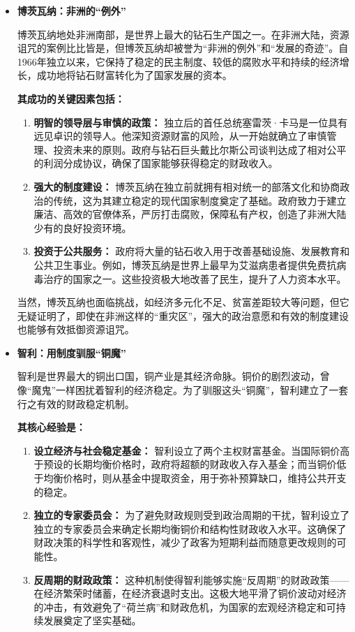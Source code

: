 \begin{itemize}
    \item \textbf{博茨瓦纳：非洲的“例外”}

    博茨瓦纳地处非洲南部，是世界上最大的钻石生产国之一。在非洲大陆，资源诅咒的案例比比皆是，但博茨瓦纳却被誉为“非洲的例外”和“发展的奇迹”。自1966年独立以来，它保持了稳定的民主制度、较低的腐败水平和持续的经济增长，成功地将钻石财富转化为了国家发展的资本。

    \textbf{其成功的关键因素包括：}
    \begin{enumerate}
        \item \textbf{明智的领导层与审慎的政策：} 独立后的首任总统塞雷茨·卡马是一位具有远见卓识的领导人。他深知资源财富的风险，从一开始就确立了审慎管理、投资未来的原则。政府与钻石巨头戴比尔斯公司谈判达成了相对公平的利润分成协议，确保了国家能够获得稳定的财政收入。
        \item \textbf{强大的制度建设：} 博茨瓦纳在独立前就拥有相对统一的部落文化和协商政治的传统，这为其建立稳定的现代国家制度奠定了基础。政府致力于建立廉洁、高效的官僚体系，严厉打击腐败，保障私有产权，创造了非洲大陆少有的良好投资环境。
        \item \textbf{投资于公共服务：} 政府将大量的钻石收入用于改善基础设施、发展教育和公共卫生事业。例如，博茨瓦纳是世界上最早为艾滋病患者提供免费抗病毒治疗的国家之一。这些投资极大地改善了民生，提升了人力资本水平。
    \end{enumerate}

    当然，博茨瓦纳也面临挑战，如经济多元化不足、贫富差距较大等问题，但它无疑证明了，即使在非洲这样的“重灾区”，强大的政治意愿和有效的制度建设也能够有效抵御资源诅咒。

    \item \textbf{智利：用制度驯服“铜魔”}

    智利是世界最大的铜出口国，铜产业是其经济命脉。铜价的剧烈波动，曾像“魔鬼”一样困扰着智利的经济稳定。为了驯服这头“铜魔”，智利建立了一套行之有效的财政稳定机制。

    \textbf{其核心经验是：}
    \begin{enumerate}
        \item \textbf{设立经济与社会稳定基金：} 智利设立了两个主权财富基金。当国际铜价高于预设的长期均衡价格时，政府将超额的财政收入存入基金；而当铜价低于均衡价格时，则从基金中提取资金，用于弥补预算缺口，维持公共开支的稳定。
        \item \textbf{独立的专家委员会：} 为了避免财政规则受到政治周期的干扰，智利设立了独立的专家委员会来确定长期均衡铜价和结构性财政收入水平。这确保了财政决策的科学性和客观性，减少了政客为短期利益而随意更改规则的可能性。
        \item \textbf{反周期的财政政策：} 这种机制使得智利能够实施“反周期”的财政政策——在经济繁荣时储蓄，在经济衰退时支出。这极大地平滑了铜价波动对经济的冲击，有效避免了“荷兰病”和财政危机，为国家的宏观经济稳定和可持续发展奠定了坚实基础。
    \end{enumerate}
\end{itemize}

